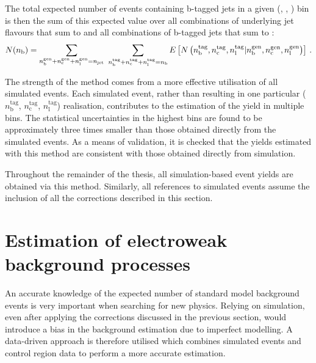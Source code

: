 The total expected number of events containing \nb b-tagged jets in a given 
(\njet, \scalht, \mht) bin is then the 
sum of this expected value over all combinations of underlying jet flavours 
that sum to \njet and all combinations of b-tagged jets that sum to \nb:
\begin{equation}
N(n_{\text{b}}) = \sum_{n_\mathrm b^\mathrm{gen} + n_\mathrm c^\mathrm{gen} + n_\mathrm 
l^\mathrm{gen} = n_{\text{jet}}} ~ \sum_{n_\mathrm b^\mathrm{tag} + n_\mathrm 
c^\mathrm{tag} + n_\mathrm l^\mathrm{tag} = n_{\text{b}}} E\left[N\left(n_\mathrm 
b^\mathrm{tag}, n_\mathrm c^\mathrm{tag}, n_\mathrm l^\mathrm{tag} | n_\mathrm 
b^\mathrm{gen}, n_\mathrm c^\mathrm{gen}, n_\mathrm l^\mathrm{gen}\right) 
\right] \, .
\end{equation}

The strength of the method comes from a more effective utilisation of all 
simulated events.
Each simulated event, rather than resulting in one particular ($n_\mathrm 
b^\mathrm{tag}$, $n_\mathrm c^\mathrm{tag}$, $n_\mathrm l^\mathrm{tag}$) 
realisation, contributes to the estimation of the yield in multiple \nb bins.
The statistical uncertainties in the highest \nb bins are found to be 
approximately three times smaller than those obtained directly from the 
simulated events.
As a means of validation, it is checked that the yields estimated with this 
method are consistent with those obtained directly from simulation.


Throughout the remainder of the thesis, all simulation-based event yields are 
obtained via this method. Similarly, all references to simulated events assume 
the inclusion of all the corrections described in this section. 

\section{Estimation of electroweak background processes}
\label{sec:analysis-estimation-ewk}
An accurate knowledge of the expected number of standard model background 
events is very important when searching for new physics. Relying on simulation, 
even after applying the corrections discussed in the previous section, would 
introduce a bias in the background estimation due to imperfect modelling. A 
data-driven approach is therefore utilised which combines simulated events and 
control region data to perform a more accurate estimation.

